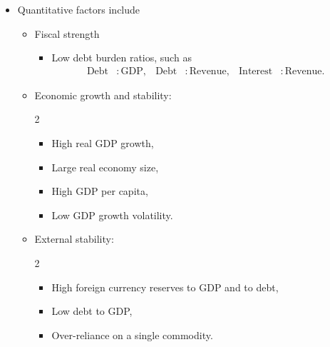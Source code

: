 \documentclass[../notes_compiled.tex]{subfiles}
\begin{document}
\begin{itemize}
\item Quantitative factors include
\begin{itemize}
\item Fiscal strength
\begin{itemize}
\item Low debt burden ratios, such as
\begin{align*}
\text{Debt}&:\text{GDP}, & \text{Debt}&:\text{Revenue}, & \text{Interest}&:\text{Revenue}.
\end{align*}
\end{itemize}
\item Economic growth and stability:
\begin{multicols}{2}
\begin{itemize}
\item High real GDP growth,
\item Large real economy size,
\item High GDP per capita,
\item Low GDP growth volatility.
\end{itemize}
\end{multicols}
\item External stability:
\begin{multicols}{2}
\begin{itemize}
\item High foreign currency reserves to GDP and to debt,
\item Low debt to GDP,
\item Over-reliance on a single commodity.
\end{itemize}
\end{multicols}
\end{itemize}

\end{itemize}
\end{document}
